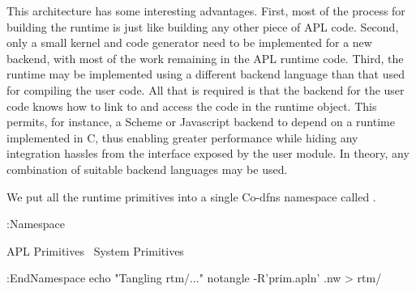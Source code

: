 \documentclass{article}%
\begin{document}
This architecture has some interesting advantages.
First, most of the process for building the runtime
is just like building any other piece of APL code.
Second, only a small kernel and code generator need to be implemented
for a new backend,
with most of the work remaining in the APL runtime code.
Third, the runtime may be implemented using a different backend language
than that used for compiling the user code.
All that is required is that the backend for the user code
knows how to link to and access the code in the runtime object.
This permits, for instance, a Scheme or Javascript backend
to depend on a runtime implemented in C,
thus enabling greater performance while hiding any 
integration hassles from the interface exposed by the user module.
In theory, any combination of suitable backend languages may be used.

We put all the runtime primitives
into a single Co-dfns namespace called {\Tt{}\nwendquote}.

\nwenddocs{}\endmoddef\nwstartdeflinemarkup\nwenddeflinemarkup
:Namespace 

        \LA{}APL Primitives~{\nwtagstyle{}}\RA{}
        \LA{}System Primitives~{\nwtagstyle{}}\RA{}

:EndNamespace
\eatline
{}\nwendcode{}\nwdocspar
\nwenddocs{}\plusendmoddef\nwstartdeflinemarkup{}\nwenddeflinemarkup
echo "Tangling rtm/..."
notangle -R'prim.apln' .nw > rtm/
\nwendcode{}\nwdocspar
\end{document}
